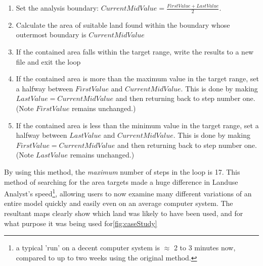   \begin{enumerate} 
  
  \item Set the analysis boundary: $CurrentMidValue=\frac{FirstValue +
  LastValue}{2}$.  
  
  \item Calculate the area of suitable land found within the boundary whose
  outermost boundary is $CurrentMidValue$ 
  
  \item If the contained area falls within the target range, write the results
  to a new file and exit the loop 
  
  \item If the contained area is more than the maximum value in the target
  range, set a halfway between $FirstValue$ and $CurrentMidValue$. This is done
  by making $LastValue=CurrentMidValue$ and then returning back to step number
  one.  (Note $FirstValue$ remains unchanged.) 
  
  \item If the contained area is less than the minimum value in the target
  range, set a halfway between $LastValue$ and $CurrentMidValue$. This is done
  by making $FirstValue=CurrentMidValue$ and then returning back to step number
  one.  (Note $LastValue$ remains unchanged.) 
  
  \end{enumerate}

By using this method, the \textit{maximum} number of steps in the loop is 17.
This method of searching for the area targets made a huge difference in Landuse
Analyst's speed\footnote{ a typical 'run' on a decent computer system is
$\approx$ 2 to 3 minutes now, compared to up to two weeks using the original
method.}, allowing users to now examine many different variations of an entire
model quickly and easily even on an average computer system.  The resultant
maps clearly show which land was likely to have been used, and for what purpose
it was being used for\ref{fig:caseStudy}
 
